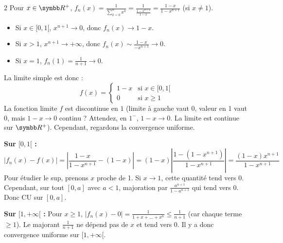 \begin{correction}{2}
Pour $x \in \R^+$, $f_n(x) = \frac{1}{\sum_{k=0}^n x^k} = \frac{1}{\frac{1-x^{n+1}}{1-x}} = \frac{1-x}{1-x^{n+1}}$ (si $x \neq 1$).
\begin{itemize}
    \item Si $x \in [0, 1[$, $x^{n+1} \to 0$, donc $f_n(x) \to 1-x$.
    \item Si $x > 1$, $x^{n+1} \to +\infty$, donc $f_n(x) \sim \frac{1-x}{-x^{n+1}} \to 0$.
    \item Si $x = 1$, $f_n(1) = \frac{1}{n+1} \to 0$.
\end{itemize}
La limite simple est donc :
$$ f(x) = \begin{cases} 1-x & \text{si } x \in [0, 1[ \\ 0 & \text{si } x \ge 1 \end{cases} $$
La fonction limite $f$ est discontinue en $1$ (limite à gauche vaut 0, valeur en 1 vaut 0, mais $1-x \to 0$ continu ? Attendez, en $1^-$, $1-x \to 0$. La limite est continue sur $\R^+$).
Cependant, regardons la convergence uniforme.

\textbf{Sur $[0, 1[$ :}
$$ |f_n(x) - f(x)| = \left| \frac{1-x}{1-x^{n+1}} - (1-x) \right| = (1-x) \left| \frac{1 - (1-x^{n+1})}{1-x^{n+1}} \right| = \frac{(1-x)x^{n+1}}{1-x^{n+1}} $$
Pour étudier le sup, prenons $x$ proche de 1. Si $x \to 1$, cette quantité tend vers $0$.
Cependant, sur tout $[0, a]$ avec $a < 1$, majoration par $\frac{a^{n+1}}{1-a^{n+1}}$ qui tend vers 0. Donc CU sur $[0, a]$.

\textbf{Sur $[1, +\infty[$ :}
Pour $x \ge 1$, $|f_n(x) - 0| = \frac{1}{1+x+\dots+x^n} \le \frac{1}{n+1}$ (car chaque terme $\ge 1$).
Le majorant $\frac{1}{n+1}$ ne dépend pas de $x$ et tend vers 0.
Il y a donc convergence uniforme sur $[1, +\infty[$.
\end{correction}

